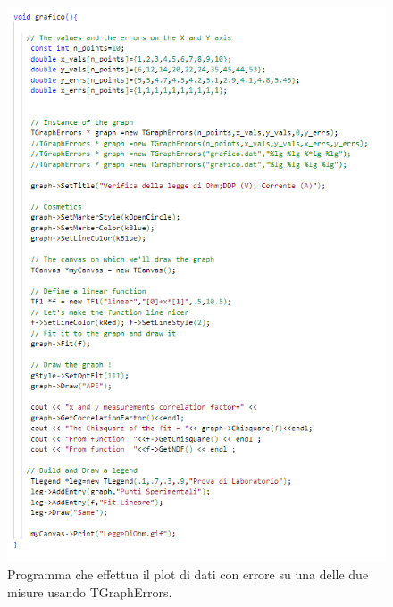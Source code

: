 \documentclass[10pt,a4paper]{article}
\begin{document}
\begin{figure}[h!]
	\centering
	\includegraphics[width=0.8\linewidth]{"Screenshot 2022-06-06 212607"}
	\caption{Programma che effettua il plot di dati con errore su una delle due misure usando TGraphErrors.}
	\label{fig:screenshot-2022-06-06-212607}
\end{figure}
\end{document}
